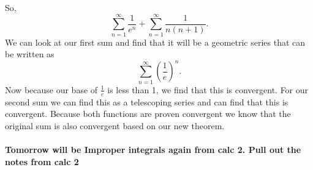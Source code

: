 So,
\[
\sum_{ n=1 } ^{ \infty } \frac{ 1 }{ e^{ n } } +\sum_{ n=1 } ^{ \infty } \frac{ 1 }{ n\left( n+1 \right)  } 
.\] 
We can look at our first sum and find that it will be a geometric series that can be written as
\[
\sum_{ n=1 } ^{ \infty } \left( \frac{ 1 }{ e }  \right) ^{ n }
.\] 
Now because our base of $ \frac{ 1 }{ e }  $ is less than 1, we find that this is convergent. For our second sum we can find this as a telescoping series and can find that this is convergent. Because both functions are proven convergent we know that the original sum is also convergent based on our new theorem.

\paragraph{Tomorrow will be Improper integrals again from calc 2. Pull out the notes from calc 2}

